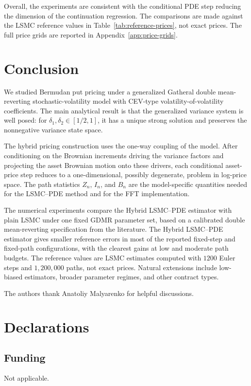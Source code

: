 \documentclass[pdflatex,sn-mathphys-num]{sn-jnl}
\theoremstyle{thmstyleone}%
\theoremstyle{thmstylethree}%
\theoremstyle{thmstyletwo}%
\begin{document}
Overall, the experiments are consistent with the conditional PDE step reducing
the dimension of the continuation regression. The comparisons are
made against the LSMC reference values in Table~\ref{tab:reference-prices}, not exact prices. The full price
grids are reported in Appendix~\ref{app:price-grids}.

\section{Conclusion}\label{sec:conclusion}

We studied Bermudan put pricing under a generalized Gatheral double
mean-reverting stochastic-volatility model with CEV-type
volatility-of-volatility coefficients. The main analytical result is that the
generalized variance system is well posed: for
$\delta_1,\delta_2\in[1/2,1]$, it has a unique strong solution and preserves
the nonnegative variance state space.

The hybrid pricing construction uses the one-way coupling of the model. After
conditioning on the Brownian increments driving the variance factors and
projecting the asset Brownian motion onto these drivers, each conditional
asset-price step reduces to a one-dimensional, possibly degenerate, problem in
log-price space. The path statistics $Z_n$, $I_n$, and $B_n$ are the
model-specific quantities
needed for the LSMC--PDE method and for the FFT implementation.

The numerical experiments compare the Hybrid LSMC--PDE estimator with plain LSMC
under one fixed GDMR parameter set, based on a calibrated double mean-reverting
specification from the literature. The Hybrid LSMC--PDE
estimator gives smaller reference errors in most of the reported fixed-step and
fixed-path configurations, with the clearest gains at low and moderate path
budgets. The reference values are
LSMC estimates computed with $1200$ Euler steps and $1{,}200{,}000$ paths,
not exact prices. Natural extensions include low-biased estimators, broader
parameter regimes, and other contract types.



\backmatter

The authors thank Anatoliy Malyarenko for helpful discussions.

\section*{Declarations}

\subsection*{Funding}
Not applicable.
\end{document}
